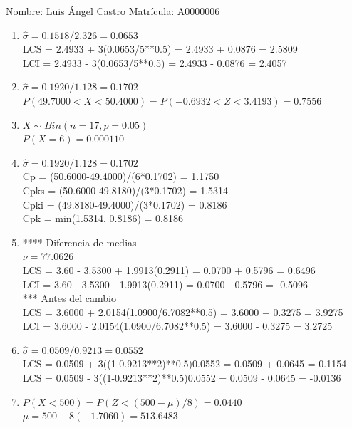 \documentclass[8pt]{report}
\begin{document}
 \newpage

Nombre: \underline{\hspace*{.2in}}
Luis Ángel Castro
\underline{\hspace*{.2in}} \quad Matr\'icula:\underline{\hspace*{.2in}}
A0000006
\underline{\hspace*{.2in}} \\

\begin{enumerate}
\item $\hat\sigma = 0.1518/2.326 = 0.0653$\\
LCS = 2.4933 + 3(0.0653/5**0.5) = 2.4933 + 0.0876 = 2.5809\\
LCI = 2.4933 - 3(0.0653/5**0.5) = 2.4933 - 0.0876 = 2.4057
\item $\hat\sigma = 0.1920/1.128 = 0.1702$\\
$P(49.7000 < X < 50.4000) = P(-0.6932 < Z < 3.4193) = 0.7556$\\
\item $X \sim Bin(n=17, p=0.05)$\\
$P(X = 6) = 0.000110$
\item $\hat\sigma = 0.1920/1.128 = 0.1702$\\
Cp = (50.6000-49.4000)/(6*0.1702) = 1.1750\\
Cpks = (50.6000-49.8180)/(3*0.1702) = 1.5314\\
Cpki = (49.8180-49.4000)/(3*0.1702) = 0.8186\\
Cpk = min(1.5314, 0.8186) = 0.8186
\item **** Diferencia de medias\\
$\nu = 77.0626$\\
LCS = 3.60 - 3.5300 + 1.9913(0.2911) = 0.0700 + 0.5796 = 0.6496\\
LCI = 3.60 - 3.5300 - 1.9913(0.2911) = 0.0700 - 0.5796 = -0.5096\\
*** Antes del cambio\\
LCS = 3.6000 + 2.0154(1.0900/6.7082**0.5) = 3.6000 + 0.3275 = 3.9275\\
LCI = 3.6000 - 2.0154(1.0900/6.7082**0.5) = 3.6000 - 0.3275 = 3.2725\\
\item $\hat\sigma = 0.0509/0.9213 = 0.0552$\\
LCS = 0.0509 + 3((1-0.9213**2)**0.5)0.0552 = 0.0509 + 0.0645 = 0.1154\\
LCS = 0.0509 - 3((1-0.9213**2)**0.5)0.0552 = 0.0509 - 0.0645 = -0.0136
\item $P(X < 500) = P(Z < (500-\mu)/8) = 0.0440$\\
$\mu = 500 - 8(-1.7060) = 513.6483$\\
\end{enumerate}
\end{document}
